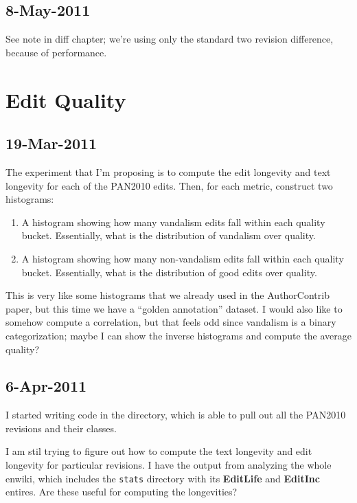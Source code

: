 \subsection{8-May-2011}

See note in diff chapter; we're using only the standard
two revision difference, because of performance.

\section{Edit Quality}

\subsection{19-Mar-2011}

The experiment that I'm proposing is to compute the edit longevity
and text longevity for each of the PAN2010 edits.
Then, for each metric, construct two histograms:
\begin{enumerate}
\item A histogram showing how many vandalism edits fall within
    each quality bucket.  Essentially, what is the distribution
    of vandalism over quality.
\item A histogram showing how many non-vandalism edits fall within
    each quality bucket.  Essentially, what is the distribution
    of good edits over quality.
\end{enumerate}
This is very like some histograms that we already used in
the AuthorContrib paper, but this time we have a ``golden annotation''
dataset.
I would also like to somehow compute a correlation, but that
feels odd since vandalism is a binary categorization;
maybe I can show the inverse histograms and compute the
average quality?

\subsection{6-Apr-2011}

I started writing code in the  directory,
which is able to pull out all the PAN2010 revisions and their classes.

I am stil trying to figure out how to compute the text longevity
and edit longevity for particular revisions.
I have the output from analyzing the whole enwiki, which includes
the \texttt{stats} directory with its \textbf{EditLife}
and \textbf{EditInc} entires.
Are these useful for computing the longevities?

